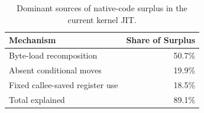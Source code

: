 \begin{table}[t]
  \centering
  \caption{Dominant sources of native-code surplus in the current kernel JIT.}
  \label{tab:motivation_root_causes}
  \small
  \begin{tabular}{lr}
    \toprule
    Mechanism & Share of Surplus \\
    \midrule
    Byte-load recomposition         & 50.7\% \\
    Absent conditional moves        & 19.9\% \\
    Fixed callee-saved register use & 18.5\% \\
    \midrule
    Total explained                 & 89.1\% \\
    \bottomrule
  \end{tabular}
\end{table}
